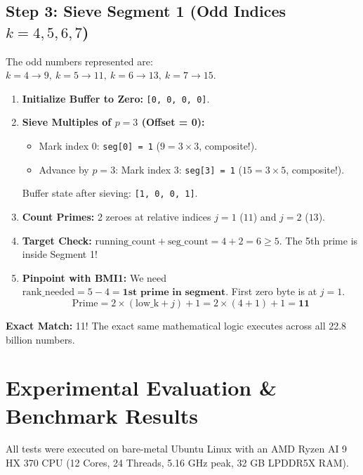 \documentclass[11pt,a4paper]{article}
\begin{document}
\subsection{Step 3: Sieve Segment 1 (Odd Indices $k = 4, 5, 6, 7$)}
The odd numbers represented are: $k=4 \to 9, \ k=5 \to 11, \ k=6 \to 13, \ k=7 \to 15$.
\begin{enumerate}\setlength{\itemsep}{0pt}
    \item \textbf{Initialize Buffer to Zero:} \texttt{[0, 0, 0, 0]}.
    \item \textbf{Sieve Multiples of $p = 3$ (Offset = 0):}
    \begin{itemize}\setlength{\itemsep}{0pt}
        \item Mark index 0: \texttt{seg[0] = 1} ($9 = 3 \times 3$, composite!).
        \item Advance by $p = 3$: Mark index 3: \texttt{seg[3] = 1} ($15 = 3 \times 5$, composite!).
    \end{itemize}
    Buffer state after sieving: \texttt{[1, 0, 0, 1]}.
    \item \textbf{Count Primes:} 2 zeroes at relative indices $j = 1$ ($11$) and $j = 2$ ($13$).
    \item \textbf{Target Check:} $\text{running\_count} + \text{seg\_count} = 4 + 2 = 6 \ge 5$. The 5th prime is inside Segment 1!
    \item \textbf{Pinpoint with BMI1:} We need $\text{rank\_needed} = 5 - 4 = \mathbf{1\text{st prime in segment}}$. First zero byte is at $j = 1$.
    \begin{equation}
        \text{Prime} = 2 \times (\text{low\_k} + j) + 1 = 2 \times (4 + 1) + 1 = \mathbf{11}
    \end{equation}
\end{enumerate}
\textbf{Exact Match:} 11! The exact same mathematical logic executes across all 22.8 billion numbers.

\newpage

\section{Experimental Evaluation \& Benchmark Results}

All tests were executed on bare-metal Ubuntu Linux with an AMD Ryzen AI 9 HX 370 CPU (12 Cores, 24 Threads, 5.16 GHz peak, 32 GB LPDDR5X RAM).
\end{document}
